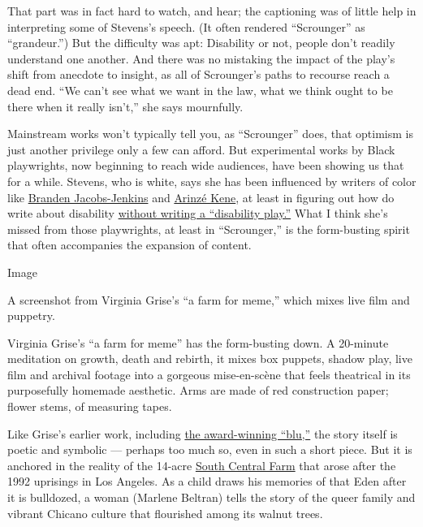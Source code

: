 That part was in fact hard to watch, and hear; the captioning was of
little help in interpreting some of Stevens's speech. (It often rendered
``Scrounger'' as ``grandeur.'') But the difficulty was apt: Disability
or not, people don't readily understand one another. And there was no
mistaking the impact of the play's shift from anecdote to insight, as
all of Scrounger's paths to recourse reach a dead end. ``We can't see
what we want in the law, what we think ought to be there when it really
isn't,'' she says mournfully.

Mainstream works won't typically tell you, as ``Scrounger'' does, that
optimism is just another privilege only a few can afford. But
experimental works by Black playwrights, now beginning to reach wide
audiences, have been showing us that for a while. Stevens, who is white,
says she has been influenced by writers of color like
\href{https://www.nytimes.com/2014/11/23/magazine/branden-jacobs-jenkins-isnt-writing-about-race.html}{Branden
Jacobs-Jenkins} and
\href{https://www.theguardian.com/stage/2019/apr/27/arinze-kene-interview-misty-death-of-a-salesman}{Arinzé
Kene}, at least in figuring out how do write about disability
\href{https://www.larktheatre.org/blog/athena-stevens-box-ticking-narrative-control/}{without
writing a ``disability play.''} What I think she's missed from those
playwrights, at least in ``Scrounger,'' is the form-busting spirit that
often accompanies the expansion of content.

Image

A screenshot from Virginia Grise's ``a farm for meme,'' which mixes live
film and puppetry.

Virginia Grise's ``a farm for meme'' has the form-busting down. A
20-minute meditation on growth, death and rebirth, it mixes box puppets,
shadow play, live film and archival footage into a gorgeous
mise-en-scène that feels theatrical in its purposefully homemade
aesthetic. Arms are made of red construction paper; flower stems, of
measuring tapes.

Like Grise's earlier work, including
\href{https://artsbeat.blogs.nytimes.com/2010/02/23/yale-drama-series-prize-awarded/}{the
award-winning ``blu,''} the story itself is poetic and symbolic ---
perhaps too much so, even in such a short piece. But it is anchored in
the reality of the 14-acre
\href{https://www.southcentralfarm.org/about-us}{South Central Farm}
that arose after the 1992 uprisings in Los Angeles. As a child draws his
memories of that Eden after it is bulldozed, a woman (Marlene Beltran)
tells the story of the queer family and vibrant Chicano culture that
flourished among its walnut trees.

